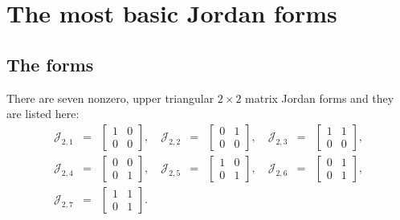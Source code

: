 \section[Basic Jordan forms]{The most basic Jordan forms}
\label{sec:Jordan:basic}

\subsection{The forms}
There are seven nonzero, upper triangular $2\times2$ matrix Jordan forms and they are listed here:
\begin{equation*}
  \begin{array}{rclrclrcl}
\mathcal{J}_{2,1} &=& \left[
                        \begin{array}{cc}
                         1 & 0 \\
                         0 & 0
                        \end{array}
                        \right], \quad
\mathcal{J}_{2,2} &=& \left[
                        \begin{array}{cc}
                         0 & 1 \\
                         0 & 0
                        \end{array}
                        \right], \quad
\mathcal{J}_{2,3} &=& \left[
                        \begin{array}{cc}
                         1 & 1 \\
                         0 & 0
                        \end{array}
                        \right], \\
\mathcal{J}_{2,4} &=& \left[
                        \begin{array}{cc}
                         0 & 0 \\
                         0 & 1
                        \end{array}
                        \right], \quad
\mathcal{J}_{2,5} &=& \left[
                        \begin{array}{cc}
                         1 & 0 \\
                         0 & 1
                        \end{array}
                        \right], \quad
\mathcal{J}_{2,6} &=& \left[
                        \begin{array}{cc}
                         0 & 1 \\
                         0 & 1
                        \end{array}
                        \right], \\
\mathcal{J}_{2,7} &=& \left[
                        \begin{array}{cc}
                         1 & 1 \\
                         0 & 1
                        \end{array}
                        \right].
  \end{array}
\end{equation*}
